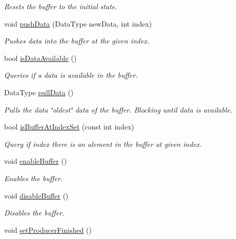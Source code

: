 \begin{DoxyCompactItemize}
\begin{DoxyCompactList}\small\item\em Resets the buffer to the initial state. \end{DoxyCompactList}\item 
void \hyperlink{class_buffer_a3f68d9a811e3c1c18ef9a9f684cd6284}{push\+Data} (Data\+Type new\+Data, int index)
\begin{DoxyCompactList}\small\item\em Pushes data into the buffer at the given index. \end{DoxyCompactList}\item 
bool \hyperlink{class_buffer_a23807200afd1b85d50578e3b2c445300}{is\+Data\+Available} ()
\begin{DoxyCompactList}\small\item\em Queries if a data is available in the buffer. \end{DoxyCompactList}\item 
Data\+Type \hyperlink{class_buffer_a8ce6d5bd9fc92b517e7b337fe0f3ef35}{pull\+Data} ()
\begin{DoxyCompactList}\small\item\em Pulls the data \char`\"{}oldest\char`\"{} data of the buffer. Blocking until data is available. \end{DoxyCompactList}\item 
bool \hyperlink{class_buffer_a5d901fc62b0711a31e3bf673320dc35b}{is\+Buffer\+At\+Index\+Set} (const int index)
\begin{DoxyCompactList}\small\item\em Query if \textquotesingle{}index\textquotesingle{} there is an alement in the buffer at given index. \end{DoxyCompactList}\item 
\hypertarget{class_buffer_a7d79fe9925caf138b127f2b366be400f}{}void \hyperlink{class_buffer_a7d79fe9925caf138b127f2b366be400f}{enable\+Buffer} ()\label{class_buffer_a7d79fe9925caf138b127f2b366be400f}

\begin{DoxyCompactList}\small\item\em Enables the buffer. \end{DoxyCompactList}\item 
\hypertarget{class_buffer_a70fbfbefc819a9f33c9afa0cd3a3d2f2}{}void \hyperlink{class_buffer_a70fbfbefc819a9f33c9afa0cd3a3d2f2}{disable\+Buffer} ()\label{class_buffer_a70fbfbefc819a9f33c9afa0cd3a3d2f2}

\begin{DoxyCompactList}\small\item\em Disables the buffer. \end{DoxyCompactList}\item 
\hypertarget{class_buffer_a2be95cbaad09978fb9bb792ae315a5d7}{}void \hyperlink{class_buffer_a2be95cbaad09978fb9bb792ae315a5d7}{set\+Producer\+Finished} ()\label{class_buffer_a2be95cbaad09978fb9bb792ae315a5d7}


\end{DoxyCompactItemize}
